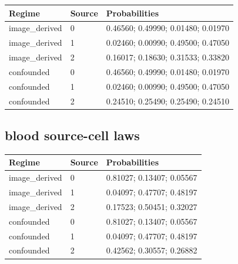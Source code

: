 \begingroup\small
\setlength{\tabcolsep}{4pt}
\begin{longtable}{p{}p{}p{}}
\toprule

Regime & Source & Probabilities\\\midrule\endhead

image\_derived & 0 & 0.46560; 0.49990; 0.01480; 0.01970\\

image\_derived & 1 & 0.02460; 0.00990; 0.49500; 0.47050\\

image\_derived & 2 & 0.16017; 0.18630; 0.31533; 0.33820\\

confounded & 0 & 0.46560; 0.49990; 0.01480; 0.01970\\

confounded & 1 & 0.02460; 0.00990; 0.49500; 0.47050\\

confounded & 2 & 0.24510; 0.25490; 0.25490; 0.24510\\

\bottomrule
\end{longtable}
\endgroup

\reservetable
\subsection{blood source-cell laws}

\begingroup\small
\setlength{\tabcolsep}{4pt}
\begin{longtable}{p{}p{}p{}}
\toprule

Regime & Source & Probabilities\\\midrule\endhead

image\_derived & 0 & 0.81027; 0.13407; 0.05567\\

image\_derived & 1 & 0.04097; 0.47707; 0.48197\\

image\_derived & 2 & 0.17523; 0.50451; 0.32027\\

confounded & 0 & 0.81027; 0.13407; 0.05567\\

confounded & 1 & 0.04097; 0.47707; 0.48197\\

confounded & 2 & 0.42562; 0.30557; 0.26882\\

\bottomrule
\end{longtable}
\endgroup

